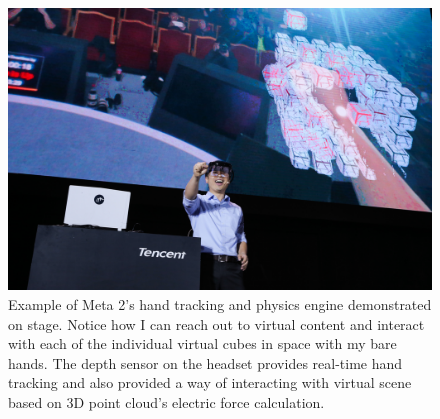 
\begin{figure}
\center
 \includegraphics[width=5in]{ch7/figures/tencent.jpg}
 \caption{Example of Meta 2's hand tracking and physics engine demonstrated on stage. Notice how I can reach out to virtual content and interact with each of the individual virtual cubes in space with my bare hands. The depth sensor on the headset provides real-time hand tracking and also provided a way of interacting with virtual scene based on 3D point cloud's electric force calculation.}
 \label{fig:meta2onstage}
\end{figure}


